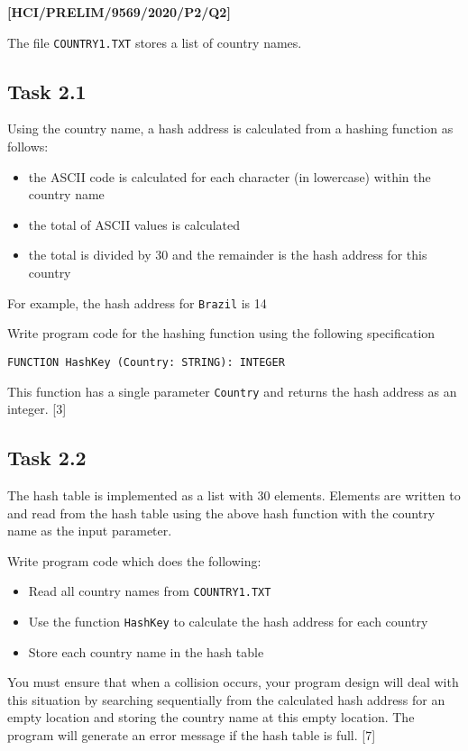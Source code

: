 \item \textbf{{[}HCI/PRELIM/9569/2020/P2/Q2{]} }

The file \texttt{COUNTRY1.TXT} stores a list of country names.

\subsection*{Task 2.1 }

Using the country name, a hash address is calculated from a hashing
function as follows: 
\begin{itemize}
\item the ASCII code is calculated for each character (in lowercase) within
the country name 
\item the total of ASCII values is calculated 
\item the total is divided by 30 and the remainder is the hash address for
this country 
\end{itemize}
For example, the hash address for \texttt{Brazil} is 14 

Write program code for the hashing function using the following specification 

\texttt{FUNCTION HashKey (Country: STRING): INTEGER }

This function has a single parameter \texttt{Country} and returns
the hash address as an integer. \hfill{}{[}3{]}

\subsection*{Task 2.2 }

The hash table is implemented as a list with 30 elements. Elements
are written to and read from the hash table using the above hash function
with the country name as the input parameter. 

Write program code which does the following: 
\begin{itemize}
\item Read all country names from \texttt{COUNTRY1.TXT} 
\item Use the function \texttt{HashKey} to calculate the hash address for
each country 
\item Store each country name in the hash table 
\end{itemize}
You must ensure that when a collision occurs, your program design
will deal with this situation by searching sequentially from the calculated
hash address for an empty location and storing the country name at
this empty location. The program will generate an error message if
the hash table is full. \hfill{}{[}7{]}

